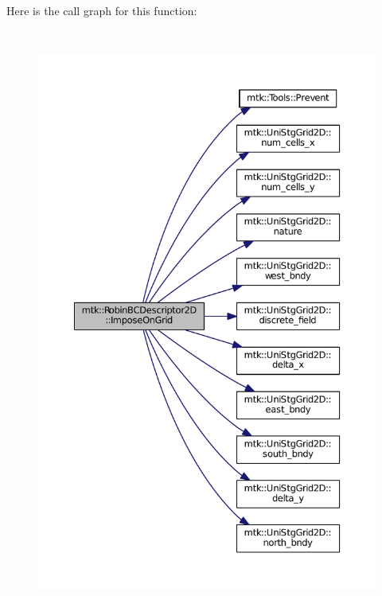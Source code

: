 Here is the call graph for this function\+:
\nopagebreak
\begin{figure}[H]
\begin{center}
\leavevmode
\includegraphics[height=550pt]{classmtk_1_1RobinBCDescriptor2D_ac9564bc46c196cbf4720a0e4b93da8b0_cgraph}
\end{center}
\end{figure}


